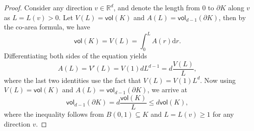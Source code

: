 \documentclass[11pt,letterpaper]{article}
\newcommand{\R}{\mathbb{R}}
\newcommand{\D}{\mathrm{d}}
\newcommand{\vol}{\mathsf{vol}}
\newcommand{\red}[1]{\textcolor{red}{#1}}
\newtheorem{lemma}[thm]{Lemma}
\begin{document}
\begin{proof}
    Consider any direction $v \in \R^d$, and denote the length from $0$ to $\partial K$ along $v$ as $L=L(v)>0$. Let $V(L)= \vol(K)$ and $A(L) = \vol_{d-1}(\partial K)$, then by the co-area formula, we have
	\[
	\vol(K) = V(L) = \int_0^L A(r) \D r.
	\]
	Differentiating both sides of the equation yields
	\[
	A(L) = V'(L)= V(1) d L^{d-1} = d \frac{V(L)}{L},
	\]
	where the last two identities use the fact that $V(L) = V(1) L^d$. 
	Now using $V(L)= \vol(K)$ and $A(L) = \vol_{d-1}(\partial K)$, we arrive at
	\[
		\vol_{d-1}(\partial K) = d \frac{\vol(K)}{L} \le d \vol(K),
	\]
	where the inequality follows from $B(0,1) \subseteq K$ and $L=L(v)\ge 1$ for any direction $v$.
\end{proof}






\end{document}
